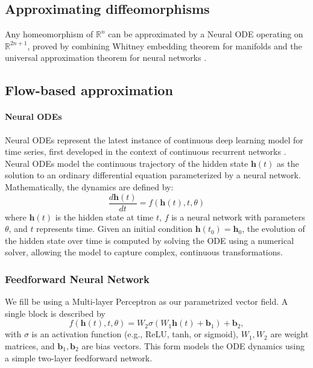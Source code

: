 \documentclass{article}
\theoremstyle{definition} \newtheorem{definition}{Definition}  \newtheorem{example}{Example}
\theoremstyle{remark} \newtheorem{remark}{Remark}
\newcounter{ct}
\begin{document}

\subsection{Approximating diffeomorphisms}\label{sec:diffeomorphisms}
Any homeomorphism of $\mathbb {R} ^{n}$ can be approximated by a Neural ODE operating on $\mathbb {R} ^{2n+1}$, proved by combining Whitney embedding theorem for manifolds and the universal approximation theorem for neural networks  \citep{zhang2020approximation}.


\subsection{Flow-based approximation}
\paragraph{Neural ODEs}
Neural ODEs \citep{chen2018neural} represent the latest instance of continuous deep learning model for time series, first developed in the context of continuous recurrent networks \citep{cohen1983absolute}.
%
Neural ODEs model the continuous trajectory of the hidden state \( \mathbf{h}(t) \) as the solution to an ordinary differential equation parameterized by a neural network. Mathematically, the dynamics are defined by:
\[
\frac{d \mathbf{h}(t)}{dt} = f(\mathbf{h}(t), t, \theta)
\]
where \( \mathbf{h}(t) \) is the hidden state at time \( t \), \( f \) is a neural network with parameters \( \theta \), and \( t \) represents time.
Given an initial condition \( \mathbf{h}(t_0) = \mathbf{h}_0 \), the evolution of the hidden state over time is computed by solving the ODE using a numerical solver, allowing the model to capture complex, continuous transformations.

\subsubsection{Feedforward Neural Network}\label{sec:fnn}
We fill be using a Multi-layer Perceptron as our parametrized vector field. 
A single block is described by
\[
f(\mathbf{h}(t), t, \theta) = W_2 \sigma(W_1 \mathbf{h}(t) + \mathbf{b}_1) + \mathbf{b}_2,
\]
with \( \sigma \) is an activation function (e.g., ReLU, tanh, or sigmoid), \( W_1, W_2 \) are weight matrices, and \( \mathbf{b}_1, \mathbf{b}_2 \) are bias vectors.
This form models the ODE dynamics using a simple two-layer feedforward network.
\end{document}
